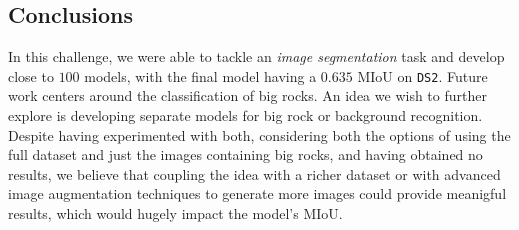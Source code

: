 \documentclass[11pt]{article}
\begin{document}
\begin{multicols}{2}
      \section{Conclusions}
      \label{sec:conclusions}

      In this challenge, we were able to tackle an \textit{image segmentation} task and develop close to $100$ models, with the final model having a $0.635$ MIoU on \texttt{DS2}. Future work centers around the classification of big rocks. An idea we wish to further explore is developing separate models for big rock or background recognition. Despite having experimented with both, considering both the options of using the full dataset and just the images containing big rocks, and having obtained no results, we believe that coupling the idea with a richer dataset or with advanced image augmentation techniques to generate more images could provide meanigful results, which would hugely impact the model's MIoU.

      
      

\end{multicols}
\end{document}
